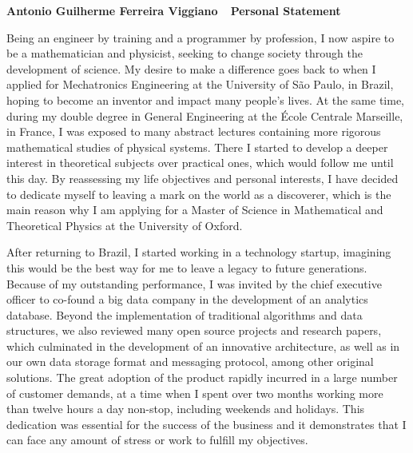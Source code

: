 \documentclass[10pt]{article}
\def\firstname{Antonio Guilherme }
\def\familyname{Ferreira Viggiano}
\def\subj{Personal Statement}
\def\FileTitle{\firstname\familyname~\textemdash~\subj}
\begin{document}
\sffamily %

{\bfseries \FileTitle}


Being an engineer by training and a programmer by profession, I now aspire to be a mathematician and physicist, seeking to change society through the development of science. My desire to make a difference goes back to when I applied for Mechatronics Engineering at the University of São Paulo, in Brazil, hoping to become an inventor and impact many people's lives. At the same time, during my double degree in General Engineering at the École Centrale Marseille, in France, I was exposed to many abstract lectures containing more rigorous mathematical studies of physical systems. There I started to develop a deeper interest in theoretical subjects over practical ones, which would follow me until this day. By reassessing my life objectives and personal interests, I have decided to dedicate myself to leaving a mark on the world as a discoverer, which is the main reason why I am applying for a Master of Science in Mathematical and Theoretical Physics at the University of Oxford.

After returning to Brazil, I started working in a technology startup, imagining this would be the best way for me to leave a legacy to future generations. Because of my outstanding performance, I was invited by the chief executive officer to co-found a big data company in the development of an analytics database. Beyond the implementation of traditional algorithms and data structures, we also reviewed many open source projects and research papers, which culminated in the development of an innovative architecture, as well as in our own data storage format and messaging protocol, among other original solutions. The great adoption of the product rapidly incurred in a large number of customer demands, at a time when I spent over two months working more than twelve hours a day non-stop, including weekends and holidays. This dedication was essential for the success of the business and it demonstrates that I can face any amount of stress or work to fulfill my objectives.
\end{document}
